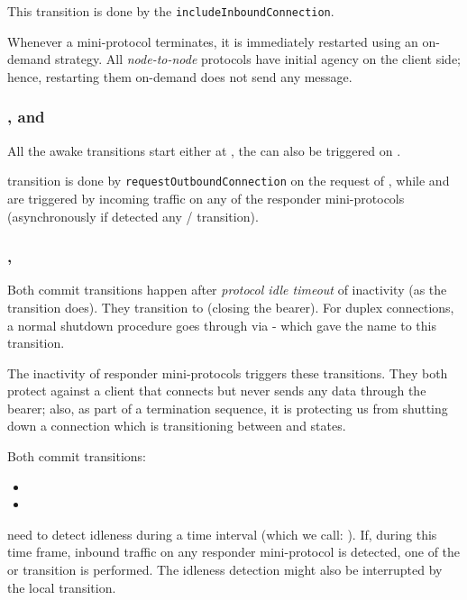 \begin{detail}
This transition is done by the \texttt{includeInboundConnection}.
\end{detail}

\begin{detail}
  Whenever a mini-protocol terminates, it is immediately restarted using
  an on-demand strategy. All \textit{node-to-node} protocols have initial agency
  on the client side; hence, restarting them on-demand does not send any
  message.
\end{detail}


\subsubsection{\AwakeDupLoc{}, \AwakeDupRem{} and \AwakeUniRem{}}
All the awake transitions start either at \InboundIdleStateAny{}, the
\AwakeDupRem{} can also be triggered on \OutboundIdleStateDup{}.

\begin{detail}
  \AwakeDupLoc{} transition is done by \texttt{requestOutboundConnection} on
  the request of \ptopgov{}, while \AwakeDupRem{} and \AwakeUniRem{} are
  triggered by incoming traffic on any of the responder mini-protocols (asynchronously if
  detected any \warm{}/\hot{} transition).
\end{detail}


\subsubsection{\CommitUniRem{}, \CommitDupRem{}}\label{sec:tr_commit}
Both commit transitions happen after \textit{protocol idle timeout} of
inactivity (as the \TimeoutExpired{} transition does). They transition to
\TerminatingState{} (closing the bearer). For duplex connections, a normal
shutdown procedure goes through \InboundIdleStateDup{}
via \CommitDupRem{} - which gave the name to this transition.

The inactivity of responder mini-protocols triggers these transitions. They
both protect against a client that connects but never sends any data through
the bearer; also, as part of a termination sequence, it is protecting us from
shutting down a connection which is transitioning between \warm{} and \hot{}
states.

Both commit transitions:
\begin{itemize}
  \item \CommitDupRem{}
  \item \CommitUniRem{}
\end{itemize}
need to detect idleness during a time interval (which we call: ). If, during this time frame, inbound traffic on any responder
mini-protocol is detected, one of the \AwakeDupRem{} or \AwakeUniRem{}
transition is performed. The idleness detection might also be interrupted by
the local \AwakeDupLoc{} transition.

